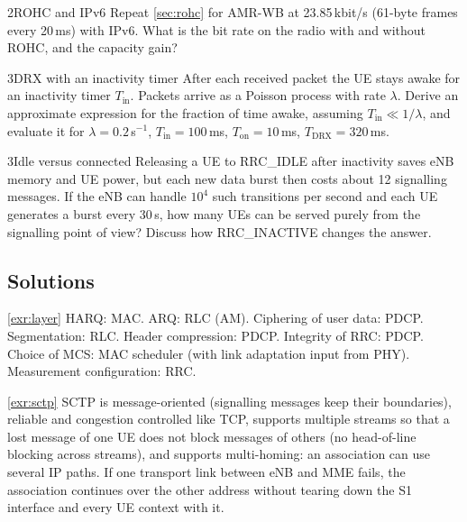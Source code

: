 \documentclass[11pt,a4paper]{article}
\begin{document}
\begin{exercisebox}{2}{ROHC and IPv6}\label{exr:rohc}
Repeat \cref{sec:rohc} for AMR-WB at 23.85\,kbit/s (61-byte frames every 20\,ms) with IPv6. What is
the bit rate on the radio with and without ROHC, and the capacity gain?
\end{exercisebox}

\begin{exercisebox}{3}{DRX with an inactivity timer}\label{exr:drxinact}
After each received packet the UE stays awake for an inactivity timer $T_{\mathrm{in}}$. Packets
arrive as a Poisson process with rate $\lambda$. Derive an approximate expression for the fraction of
time awake, assuming $T_{\mathrm{in}} \ll 1/\lambda$, and evaluate it for $\lambda = 0.2$\,s$^{-1}$,
$T_{\mathrm{in}} = 100$\,ms, $T_{\mathrm{on}} = 10$\,ms, $T_{\mathrm{DRX}} = 320$\,ms.
\end{exercisebox}

\begin{exercisebox}{3}{Idle versus connected}\label{exr:idleconn}
Releasing a UE to RRC\_IDLE after inactivity saves eNB memory and UE power, but each new data burst
then costs about 12 signalling messages. If the eNB can handle $10^4$ such transitions per second and
each UE generates a burst every 30\,s, how many UEs can be served purely from the signalling point of
view? Discuss how RRC\_INACTIVE changes the answer.
\end{exercisebox}

\subsection*{Solutions}

\begin{solutionbox}{\ref{exr:layer}}
HARQ: MAC. ARQ: RLC (AM). Ciphering of user data: PDCP. Segmentation: RLC. Header compression:
PDCP. Integrity of RRC: PDCP. Choice of MCS: MAC scheduler (with link adaptation input from PHY).
Measurement configuration: RRC.
\end{solutionbox}

\begin{solutionbox}{\ref{exr:sctp}}
SCTP is message-oriented (signalling messages keep their boundaries), reliable and congestion
controlled like TCP, supports multiple streams so that a lost message of one UE does not block
messages of others (no head-of-line blocking across streams), and supports multi-homing: an
association can use several IP paths. If one transport link between eNB and MME fails, the
association continues over the other address without tearing down the S1 interface and every UE
context with it.
\end{solutionbox}
\end{document}
